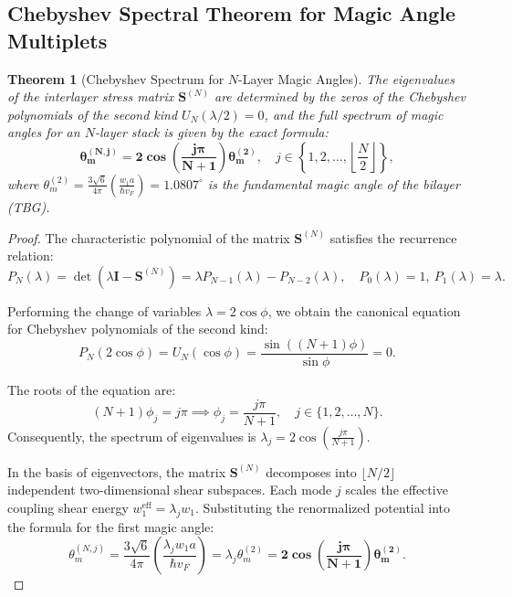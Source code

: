 \documentclass[12pt,a4paper]{article}
\newtheorem{theorem}{Theorem}
\begin{document}
				\subsection{Chebyshev Spectral Theorem for Magic Angle Multiplets}
				\begin{theorem}[Chebyshev Spectrum for $N$-Layer Magic Angles]
					The eigenvalues of the interlayer stress matrix $\mathbf{S}^{(N)}$ are determined by the zeros of the Chebyshev polynomials of the second kind $U_N(\lambda/2) = 0$, and the full spectrum of magic angles for an $N$-layer stack is given by the exact formula:
					\begin{equation}
						\mathbf{\theta_m^{(N, j)} = 2 \cos\left( \frac{j \pi}{N+1} \right) \theta_m^{(2)}}, \quad j \in \left\{1, 2, \dots, \left\lfloor \frac{N}{2} \right\rfloor \right\},
					\end{equation}
					where $\theta_m^{(2)} = \frac{3\sqrt{6}}{4\pi}\left(\frac{w_1 a}{\hbar v_F}\right) = 1.0807^\circ$ is the fundamental magic angle of the bilayer (TBG).
				\end{theorem}
				
				\begin{proof}
					The characteristic polynomial of the matrix $\mathbf{S}^{(N)}$ satisfies the recurrence relation:
					\begin{equation}
						P_N(\lambda) = \det(\lambda \mathbf{I} - \mathbf{S}^{(N)}) = \lambda P_{N-1}(\lambda) - P_{N-2}(\lambda), \quad P_0(\lambda) = 1, \ P_1(\lambda) = \lambda.
					\end{equation}
					
					Performing the change of variables $\lambda = 2 \cos\phi$, we obtain the canonical equation for Chebyshev polynomials of the second kind:
					\begin{equation}
						P_N(2\cos\phi) = U_N(\cos\phi) = \frac{\sin((N+1)\phi)}{\sin\phi} = 0.
					\end{equation}
					
					The roots of the equation are:
					\begin{equation}
						(N+1)\phi_j = j \pi \implies \phi_j = \frac{j \pi}{N+1}, \quad j \in \{1, 2, \dots, N\}.
					\end{equation}
					Consequently, the spectrum of eigenvalues is $\lambda_j = 2 \cos\left(\frac{j\pi}{N+1}\right)$.
					
					In the basis of eigenvectors, the matrix $\mathbf{S}^{(N)}$ decomposes into $\lfloor N/2 \rfloor$ independent two-dimensional shear subspaces. Each mode $j$ scales the effective coupling shear energy $w_1^{\text{eff}} = \lambda_j w_1$. Substituting the renormalized potential into the formula for the first magic angle:
					\begin{equation}
						\theta_m^{(N, j)} = \frac{3\sqrt{6}}{4\pi} \left( \frac{\lambda_j w_1 a}{\hbar v_F} \right) = \lambda_j \theta_m^{(2)} = \mathbf{2 \cos\left( \frac{j \pi}{N+1} \right) \theta_m^{(2)}}.
					\end{equation}
					\end{proof}
					
\end{document}

